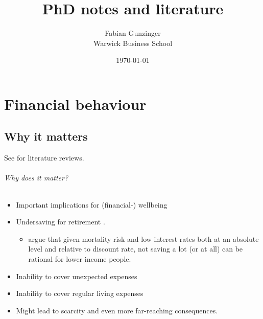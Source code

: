 \documentclass[a4paper, 11pt]{report}
\title{\textbf{PhD notes and literature}}
\author{Fabian Gunzinger \\ Warwick Business School}
\date{\today}
\begin{document}
\maketitle
\tableofcontents
\newpage



						\part{Financial behaviour}


						\chapter{Why it matters}

See \citet{agarwal2017shapes,greenberg2019financial} for literature reviews.


\paragraph{Why does it matter?}
\begin{itemize}
	\item Important implications for (financial-) wellbeing \citep{lynch2011introduction}

	\item Undersaving for retirement \citep{benartzi2013behavioral}.
	\begin{itemize}
		\item \citet{scott2020can} argue that given mortality risk and low interest rates both at an absolute level and relative to discount rate, not saving a lot (or at all) can be rational for lower income people.
	\end{itemize}

	\item Inability to cover unexpected expenses \citep{lusardi2011financially}

	\item Inability to cover regular living expenses

	\item Might lead to scarcity and even more far-reaching consequences.
\end{itemize}
\end{document}
